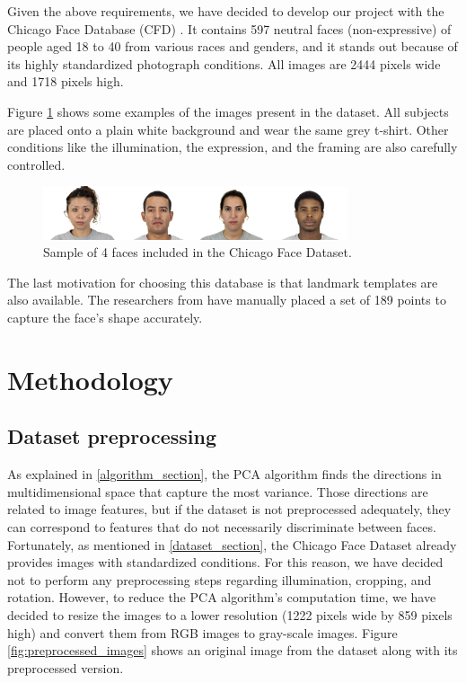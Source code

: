 \documentclass{article}
\begin{document}
Given the above requirements, we have decided to develop our project with the Chicago Face Database (CFD) \cite{debbie-2015}. It contains 597 neutral faces (non-expressive) of people aged 18 to 40 from various races and genders, and it stands out because of its highly standardized photograph conditions. All images are 2444 pixels wide and 1718 pixels high.

Figure \ref{fig:cfd} shows some examples of the images present in the dataset. All subjects are placed onto a plain white background and wear the same grey t-shirt. Other conditions like the illumination, the expression, and the framing are also carefully controlled.

\begin{figure}[H]
    \centering
    \vspace{0in}
    \includegraphics[width=0.8\textwidth]{images/cfd.jpg}
    \caption{Sample of 4 faces included in the Chicago Face Dataset.}
    \label{fig:cfd}
\end{figure}

The last motivation for choosing this database is that landmark templates are also available. The researchers from \cite{singh-2022} have manually placed a set of 189 points to capture the face's shape accurately.


\section{Methodology}

\subsection{Dataset preprocessing}

As explained in \ref{algorithm_section}, the PCA algorithm finds the directions in multidimensional space that capture the most variance. Those directions are related to image features, but if the dataset is not preprocessed adequately, they can correspond to features that do not necessarily discriminate between faces. Fortunately, as mentioned in \ref{dataset_section}, the Chicago Face Dataset already provides images with standardized conditions. For this reason, we have decided not to perform any preprocessing steps regarding illumination, cropping, and rotation. However, to reduce the PCA algorithm's computation time, we have decided to resize the images to a lower resolution (1222 pixels wide by 859 pixels high) and convert them from RGB images to gray-scale images. Figure \ref{fig:preprocessed_images} shows an original image from the dataset along with its preprocessed version.
\end{document}
